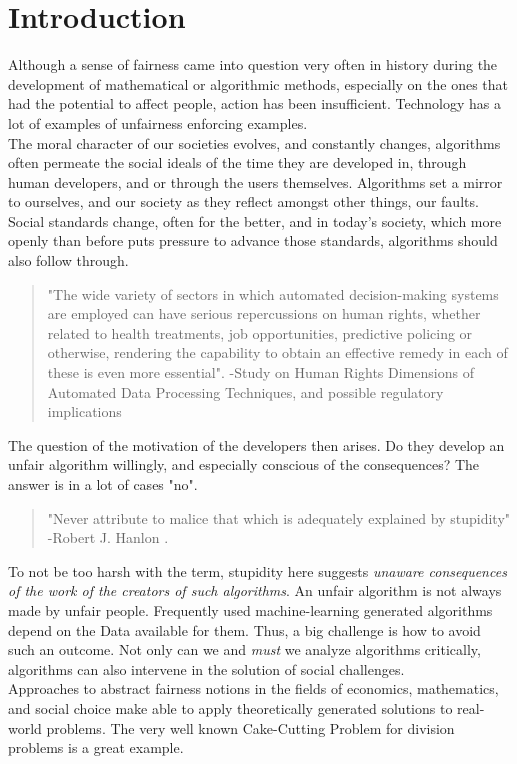 \section{Introduction}

Although a sense of fairness came into question very often in history during the development of mathematical or algorithmic methods, especially on the ones that had the potential to affect people\cite{Phen20}, action has been insufficient. Technology has a lot of examples of unfairness enforcing examples. \\
The moral character of our societies evolves, and constantly changes, algorithms often permeate the social ideals of the time they are developed in, through human developers, and or through the users themselves. Algorithms set a mirror to ourselves, and our society as they reflect amongst other things, our faults. Social standards change\cite{Sewe17}, often for the better, and in today's society, which more openly than before puts pressure to advance those standards, algorithms should also follow through.
\begin{quote}
"The wide variety of sectors in which automated decision-making systems are employed
can have serious repercussions on human rights, whether related to health treatments,
job opportunities, predictive policing or otherwise, rendering the capability to obtain an
effective remedy in each of these is even more essential". -Study on Human Rights Dimensions of Automated Data Processing Techniques, and possible regulatory implications\cite{CommNaN}
\end{quote}
The question of the motivation of the developers then arises. Do they develop an unfair algorithm willingly, and especially conscious of the consequences? The answer is in a lot of cases "no". \cite{OCDK19}
\begin{quote}
  "Never attribute to malice that which is adequately explained by stupidity" -Robert J. Hanlon
 \cite{Bloc81}.
\end{quote}
To not be too harsh with the term, stupidity here suggests \textsl{unaware consequences of the work of the creators of such algorithms}. An unfair algorithm is not always made by unfair people. Frequently used machine-learning generated algorithms depend on the Data available for them. Thus, a big challenge is how to avoid such an outcome. Not only can we and \textsl{must} we analyze algorithms critically, algorithms can also intervene in the solution of social challenges. \\
Approaches to abstract fairness notions in the fields of economics, mathematics, and social choice make able to apply theoretically generated solutions to real-world problems. The very well known Cake-Cutting Problem for division problems is a great example. \\
